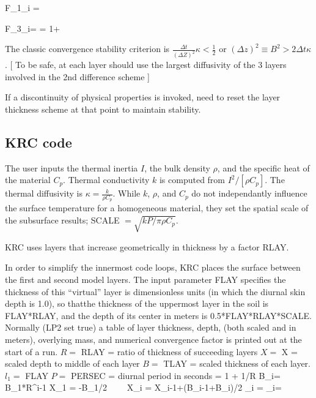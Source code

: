 \documentclass{article}
\begin{document}
\qbn F_{1_i} =    \qen

\qbn F_{3_i}= 
 =  { 1+ 
    }\qen

 
 The classic convergence stability criterion is $\frac {\Delta t}{(\Delta Z)^2}
 \kappa < \frac{1}{2}$ or $ (\Delta z)^2 \equiv B^2 > 2 \Delta t \kappa $.  
[ To be safe, at each  layer should use the largest diffusivity of the 3 layers 
involved in the 2nd difference scheme ]

If a discontinuity of physical properties is invoked, need to reset the layer
thickness scheme at that point to maintain stability.


\subsection{KRC code}

The user inputs the thermal inertia $I$, the bulk density $\rho$, and the
specific heat of the material $C_p$. Thermal conductivity $k$ is computed from
  $I^2 / [\rho C_p]$. The thermal diffusivity is $\kappa = \frac{k}{\rho C_p}$.
While $k$, $\rho$, and $C_p$ do not independantly influence the surface
temperature for a homogeneous material, they set the spatial scale of the
subsurface results; SCALE $= \sqrt{kP /\pi \rho C_p}$. 

KRC uses layers that increase geometrically in thickness by a factor RLAY.

In order to simplify the innermost code loops, KRC places the surface between
the first and second model layers. The input parameter FLAY specifies the
thickness of this ``virtual'' layer is dimensionless units (in which the diurnal
skin depth is 1.0), so thatthe thickness of the uppermost layer in the soil is
FLAY*RLAY, and the depth of its center in meters is 0.5*FLAY*RLAY*SCALE.
Normally (LP2 set true) a table of layer thickness, depth, (both scaled and in
meters), overlying mass, and numerical convergence factor is printed out at the
start of a run.
\qi $R=$ RLAY = ratio of thickness of succeeding layers
\qi $X=$ X = scaled depth to middle of each layer
\qi $B=$ TLAY = scaled thickness of each layer. $l_1=$ FLAY
\qi $P=$ PERSEC = diurnal period in seconds
\qbn {} = 1 + 1/R \qen
\qbn B_i= B_1*R^{i-1}  \qen 
\qbn X_1 = -B_1/2 \ \ \ \ X_i = X_{i-1}+(B_{i-1}+B_i)/2 \qen
\qbn {}_i =  \qen
\qbn {}_i= \qen
\end{document}

